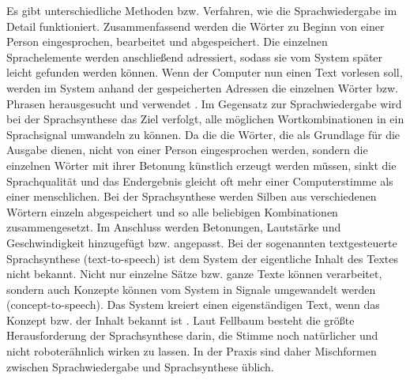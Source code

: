 \newline \newline
Es gibt unterschiedliche Methoden bzw. Verfahren, wie die Sprachwiedergabe im Detail funktioniert. Zusammenfassend werden die Wörter zu Beginn von einer Person eingesprochen, bearbeitet und abgespeichert. Die einzelnen Sprachelemente werden anschließend adressiert, sodass sie vom System später leicht gefunden werden können. Wenn der Computer nun einen Text vorlesen soll, werden im System anhand der gespeicherten Adressen die einzelnen Wörter bzw. Phrasen herausgesucht und verwendet \cite{FellbaumSprache}.
\newline \newline
Im Gegensatz zur Sprachwiedergabe wird bei der Sprachsynthese das Ziel verfolgt, alle möglichen Wortkombinationen in ein Sprachsignal umwandeln zu können. Da die die Wörter, die als Grundlage für die Ausgabe dienen, nicht von einer Person eingesprochen werden, sondern die einzelnen Wörter mit ihrer Betonung künstlich erzeugt werden müssen, sinkt die Sprachqualität und das Endergebnis gleicht oft mehr einer Computerstimme als einer menschlichen. 
\newline \newline
Bei der Sprachsynthese werden Silben aus verschiedenen Wörtern einzeln abgespeichert und so alle beliebigen Kombinationen zusammengesetzt. Im Anschluss werden Betonungen, Lautstärke und Geschwindigkeit hinzugefügt bzw. angepasst. Bei der sogenannten textgesteuerte Sprachsynthese (text-to-speech) ist dem System der eigentliche Inhalt des Textes nicht bekannt. Nicht nur einzelne Sätze bzw. ganze Texte können verarbeitet, sondern auch Konzepte können vom System in Signale umgewandelt werden (concept-to-speech). Das System kreiert einen eigenständigen Text, wenn das Konzept bzw. der Inhalt bekannt ist \cite{FellbaumSprache}.
\newline \newline
Laut Fellbaum \cite{FellbaumSprache} besteht die größte Herausforderung der Sprachsynthese darin, die Stimme noch natürlicher und nicht roboterähnlich wirken zu lassen. In der Praxis sind daher Mischformen zwischen Sprachwiedergabe und Sprachsynthese üblich. 


